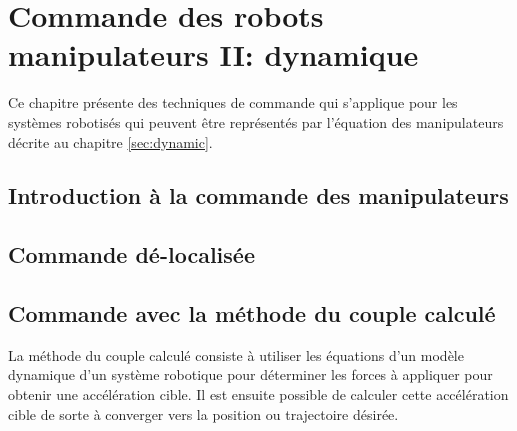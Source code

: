 \chapter{Commande des robots manipulateurs II: dynamique}

Ce chapitre présente des techniques de commande qui s'applique pour les systèmes robotisés qui peuvent être représentés par l'équation des manipulateurs décrite au chapitre \ref{sec:dynamic}.

\section{Introduction à la commande des manipulateurs}







\newpage
\section{Commande dé-localisée}



\newpage
\section{Commande avec la méthode du couple calculé}

La méthode du couple calculé consiste à utiliser les équations d'un modèle dynamique d'un système robotique pour déterminer les forces à appliquer pour obtenir une accélération cible. Il est ensuite possible de calculer cette accélération cible de sorte à converger vers la position ou trajectoire désirée.

